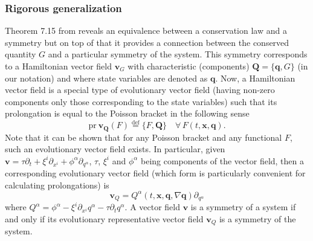 \documentclass[
10pt, %
a4paper, %
oneside, %
headinclude,footinclude, %
BCOR5mm, %
]{scrartcl}
\newcommand{\xx}{\mathbf{x}}
\newcommand{\vv}{\mathbf{v}}
\newcommand{\qq}{\mathbf{q}}
\newcommand{\QQ}{\mathbf{Q}}
\newcommand{\MP}[1]{{\color{OliveGreen}MP:\ \ #1}}
\newcommand{\IP}[1]{{\color{Red}IP:\ \ #1}}
\newcommand{\Ffunc}{F}
\newcommand{\Gfunc}{G}
\begin{document}
\subsubsection{Rigorous generalization}\label{sec.rigorous}

Theorem 7.15 from \cite{olver2000applications} reveals an equivalence between a 
conservation law and a symmetry but on top of that it provides a connection 
between the conserved quantity $\Gfunc$ and a particular symmetry of the 
system. This symmetry corresponds to a Hamiltonian vector field $\vv_\Gfunc$ 
with characteristic (components) $\QQ=\{\qq,\Gfunc\}$ (in our notation) and 
where state variables are denoted as $\qq$. Now, a Hamiltonian vector field is 
a special type of evolutionary vector field (having non-zero components only 
those corresponding to the state variables) such that its prolongation is equal 
to the Poisson bracket in the following sense 
\begin{equation}
	\mathrm{pr} ~ \vv_\QQ(\Ffunc) \stackrel{\mathrm{def}}{=} \{\Ffunc,\QQ\} 
	\quad\forall\,\Ffunc(t,\xx,\qq).
\end{equation}
Note that it 
can be shown that for any Poisson bracket and any functional $\Ffunc$, such an 
evolutionary vector field exists. In particular, given $\vv = \tau \partial_t + 
\xi^i 
\partial_{x^i} + \phi^\alpha \partial_{q^\alpha}$,
$\tau$, $\xi^i$ and $\phi^\alpha$ being components of the vector field,
then a 
corresponding evolutionary vector field (which form is particularly convenient 
for calculating prolongations) is 
\begin{equation}
	\vv_Q =  Q^\alpha(t,\xx,\qq,\nabla \qq) \partial_{q^\alpha}
\end{equation}
where $Q^\alpha = \phi^\alpha - \xi^i \partial_{x^i} q^\alpha - \tau \partial_t 
q^\alpha$.
A vector field $\vv$ is a 
symmetry of 
a system if and only if its 
evolutionary representative vector field $\vv_Q$ is a symmetry of the system. 
\end{document}
